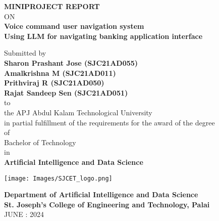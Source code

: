 \thispagestyle{empty}
\begin{center}
 
{\normalsize \bf MINIPROJECT REPORT}\\
ON\\
\vspace*{0.2 cm}
{\huge \bf Voice command user navigation system}\\
{\normalsize \bf Using LLM for navigating banking application interface}

   \vspace{0.5 cm}
   \large Submitted by\\
   { \bf Sharon Prashant Jose (SJC21AD055)}\\
   { \bf Amalkrishna M (SJC21AD011)}\\
   { \bf Prithviraj R (SJC21AD050)}\\
   { \bf Rajat Sandeep Sen (SJC21AD051)}\\[-0.6mm]
  {\large to\\[-0.6mm] the APJ Abdul Kalam Technological University\\[-0.6mm] in partial fulfillment of the requirements for the award of the degree\\[-0.6mm] of\\[-0.6mm] Bachelor of Technology\\[-0.6mm] in\\[-0.6mm] {\bf Artificial Intelligence and Data Science}}
  
   \begin{center}
   \texttt{[image: Images/SJCET\_logo.png]}
   \end{center}
   \vspace*{-0.5cm}
  {\LARGE {\bf Department of Artificial Intelligence and Data Science}}\\
          [-3mm] {\large {\bf St. Joseph's College of Engineering and Technology, Palai}\\
           [1mm] JUNE : 2024}

\end{center}
\newpage
\thispagestyle{empty}
